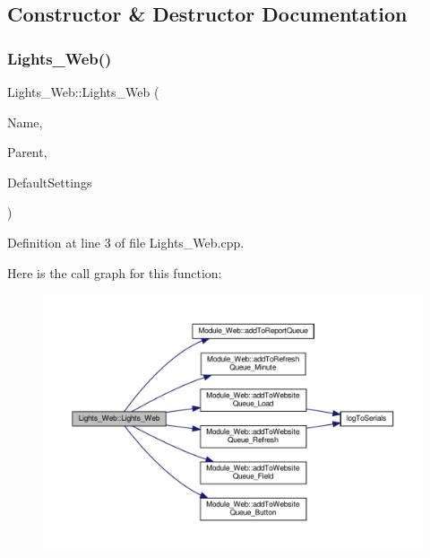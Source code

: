 \subsection{Constructor \& Destructor Documentation}
\mbox{\label{class_lights___web_acaf75aed6b86ca10828c967049c59383}} 
\subsubsection{\texorpdfstring{Lights\+\_\+\+Web()}{Lights\_Web()}}
{\footnotesize\ttfamily Lights\+\_\+\+Web\+::\+Lights\+\_\+\+Web (\begin{DoxyParamCaption}\item[{const \+\_\+\+\_\+\+Flash\+String\+Helper $\ast$}]{Name,  }\item[{\hyperlink{class_module___web}{Module\+\_\+\+Web} $\ast$}]{Parent,  }\item[{\hyperlink{struct_settings_1_1_lights_settings}{Settings\+::\+Lights\+Settings} $\ast$}]{Default\+Settings }\end{DoxyParamCaption})}



Definition at line 3 of file Lights\+\_\+\+Web.\+cpp.

Here is the call graph for this function\+:
\nopagebreak
\begin{figure}[H]
\begin{center}
\leavevmode
\includegraphics[width=350pt]{class_lights___web_acaf75aed6b86ca10828c967049c59383_cgraph}
\end{center}
\end{figure}


